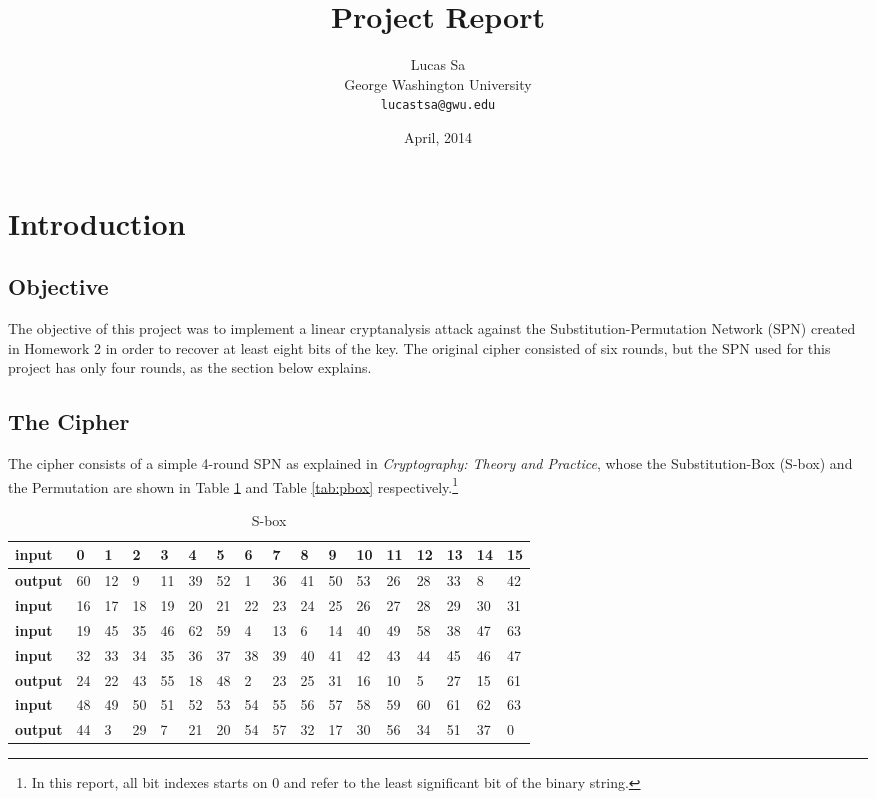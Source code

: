 \documentclass[11pt]{article}
\title{\textbf{Project Report}}
\author{Lucas Sa \\
George Washington University \\
{\tt lucastsa@gwu.edu}}
\date{April, 2014}
\begin{document}
\maketitle

\section{Introduction}

\subsection{Objective}
The objective of this project was to implement a linear cryptanalysis attack against the Substitution-Permutation Network (SPN) created in Homework 2 in order to recover at least eight bits of the key. The original cipher consisted of six rounds, but the SPN used for this project has only four rounds, as the section below explains.

\subsection{The Cipher}

The cipher consists of a simple 4-round SPN as explained in \emph{Cryptography: Theory and Practice}\cite{stinson2005cryptography}, whose the Substitution-Box (S-box) and the Permutation are shown in Table \ref{tab:sbox} and Table \ref{tab:pbox} respectively.\footnote{In this report, all bit indexes starts on 0 and refer to the least significant bit of the binary string.}


\begin{table}
	\small
	\setlength{\tabcolsep}{5pt}
    \centering
    \begin{tabular}{|l|l|l|l|l|l|l|l|l|l|l|l|l|l|l|l|l|}
    \hline
	\textbf{input} & 0 & 1 & 2 & 3 & 4 & 5 & 6 & 7 & 8 & 9 & 10 & 11 & 12 & 13 & 14 & 15  \\ \hline
	\textbf{output} & 60 & 12 & 9 & 11 & 39 & 52 & 1 & 36 & 41 & 50 & 53 & 26 & 28 & 33 & 8 & 42 \\ \hline \hline

	\textbf{input} & 16 & 17 & 18 & 19 & 20 & 21 & 22 & 23 & 24 & 25 & 26 & 27 & 28 & 29 & 30 & 31  \\ \hline 
	\textbf{input} & 19 & 45 & 35 & 46 & 62 & 59 & 4 & 13 & 6 & 14 & 40 & 49 & 58 & 38 & 47 & 63 \\ \hline \hline

	\textbf{input} & 32 & 33 & 34 & 35 & 36 & 37 & 38 & 39 & 40 & 41 & 42 & 43 & 44 & 45 & 46 & 47 \\ \hline
	\textbf{output} & 24 & 22 & 43 & 55 & 18 & 48 & 2 & 23 & 25 & 31 & 16 & 10 & 5 & 27 & 15 & 61 \\ \hline \hline
	
	\textbf{input} & 48 & 49 & 50 & 51 & 52 & 53 & 54 & 55 & 56 & 57 & 58 & 59 & 60 & 61 & 62 & 63 \\ \hline
	\textbf{output} & 44 & 3 & 29 & 7 & 21 & 20 & 54 & 57 & 32 & 17 & 30 & 56 & 34 & 51 & 37 & 0 \\ \hline 
	
    \end{tabular}
    \caption{S-box}
    \label{tab:sbox}
\end{table}
\end{document}
